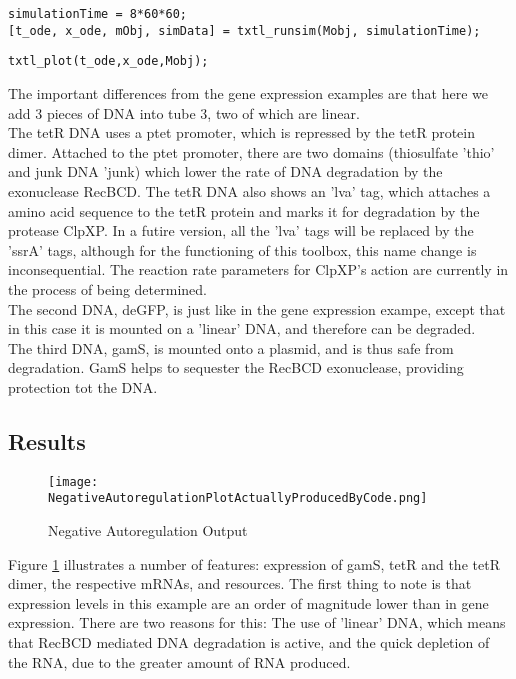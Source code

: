 								\texttt{simulationTime =  8*60*60;}\\
								\texttt{[t\_ode, x\_ode, mObj, simData] = txtl\_runsim(Mobj, simulationTime);}
								\vspace*{1\baselineskip}
								
									 \begin{flushleft}
						 \texttt{\noindent txtl\_plot(t\_ode,x\_ode,Mobj); \\} 
						 \end{flushleft}
		
		The important differences from the gene expression examples are that here we add 3 pieces of DNA into tube 3, two of which are linear. \\
		The tetR DNA uses a ptet promoter, which is repressed by the tetR protein dimer. Attached to the ptet promoter, there are two domains (thiosulfate 'thio' and junk DNA 'junk) which lower the rate of DNA degradation by the exonuclease RecBCD. The tetR DNA also shows an 'lva' tag, which attaches a amino acid sequence to the tetR protein and marks it for degradation by the protease ClpXP. In a futire version, all the 'lva' tags will be replaced by the 'ssrA' tags, although for the functioning of this toolbox, this name change is inconsequential. The reaction rate parameters for ClpXP's action are currently in the process of being determined. \\
		The second DNA, deGFP, is just like in the gene expression exampe, except that in this case it is mounted on a 'linear' DNA, and therefore can be degraded. \\ 
		The third DNA, gamS, is mounted onto a plasmid, and is thus safe from degradation. GamS helps to sequester the RecBCD exonuclease, providing protection tot the DNA. \\
		
		
		\subsection{Results}	
		
		\begin{figure}
		\begin{center}
		\texttt{[image: NegativeAutoregulationPlotActuallyProducedByCode.png]} 
		\caption{Negative Autoregulation Output}
		\label{fig:negautoreg}
		\end{center}
		
		\end{figure}
		Figure \ref{fig:negautoreg} illustrates a number of features: expression of gamS, tetR and the tetR dimer, the respective mRNAs, and resources. The first thing to note is that expression levels in this example are an order of magnitude lower than in gene expression. There are two reasons for this: The use of 'linear' DNA, which means that RecBCD mediated DNA degradation is active, and the quick depletion of the RNA, due to the greater amount of RNA produced.  
		
